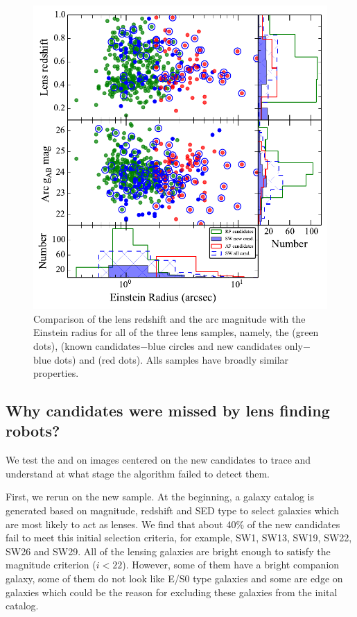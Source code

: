 \documentclass[useAMS,usenatbib,a4paper]{mn2e}
\begin{document}
\begin{figure}
\begin{center}
\includegraphics[scale=0.65]{zl_mg_re.pdf}
\caption{ \label{fig:zlmgre}
Comparison of the lens redshift and the arc magnitude with the
Einstein radius for all of the three lens samples, namely, the \rf (green dots),
\sw (known candidates$-$blue circles and new candidates only$-$blue dots)
and \af (red dots). Alls samples have broadly similar properties.}
\end{center}
\end{figure}

\subsection{Why \sw candidates were missed by lens finding robots?}
We test the \rf and \af on images centered on the new \sw candidates to
trace and understand at what stage the algorithm failed to detect them.

First, we rerun \rf on the new \sw sample. At the beginning, a galaxy
catalog is generated based on magnitude, redshift and SED type
\citep[see]{Gavazzi2014} to select galaxies which are most likely to act
as lenses. We find that about 40\% of the new \sw candidates fail to
meet this initial selection criteria, for example, SW1, SW13, SW19,
SW22, SW26 and SW29.  All of the lensing galaxies are bright enough to
satisfy the magnitude criterion ($i<22$). However, some of them have a
bright companion galaxy, some of them do not look like E/S0 type
galaxies and some are edge on galaxies which could be the reason for
excluding these galaxies from the inital catalog.
\end{document}
